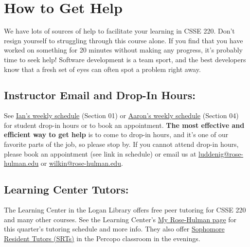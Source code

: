 \section*{How to Get Help}%
\label{sec:help}
We have lots of sources of help to facilitate your learning in CSSE 220. 
Don't resign yourself to struggling through this course alone. 
If you find that you have worked on something for 20 minutes 
without making any progress, 
it's probably time to seek help! 
Software development is a team sport, and 
the best developers know that a fresh set of eyes 
can often spot a problem right away. 

\subsection*{Instructor Email and Drop-In Hours:} 
See \href{https://docs.google.com/spreadsheets/d/1ip7XzOZyyDw10I6bsKDlkzAO0PowF4jPwrGiODMnQn8/edit?usp=sharing}{Ian's weekly schedule} (Section 01) or 
\href{https://docs.google.com/spreadsheets/d/13pt51VxLBnc-UkcqvvYSouB_YVTu_SEh5wCXk4I1-8c/edit?usp=sharing}{Aaron's weekly schedule} (Section 04)  
for student drop-in hours or to book an appointment. 
\textbf{The most effective and efficient way to get help} 
is to come to drop-in hours, and 
it's one of our favorite parts of the job, 
so please stop by. 
If you cannot attend drop-in hours, 
please book an appointment (see link in schedule) or email us at 
\href{mailto:luddenig@rose-hulman.edu}{luddenig@rose-hulman.edu} or 
\href{mailto:wilkin@rose-hulman.edu}{wilkin@rose-hulman.edu}. 


\subsection*{Learning Center Tutors:}
The Learning Center in the Logan Library offers 
free peer tutoring for CSSE 220 and many other courses. 
See the Learning Center's 
\href{https://rosehulman.sharepoint.com/sites/LC}{My Rose-Hulman page} 
for this quarter's tutoring schedule and more info. 
They also offer \href{https://rosehulman.sharepoint.com/sites/LC/SitePages/SRT-Tutoring.aspx}{Sophomore Resident Tutors (SRTs)} in the Percopo classroom in the evenings. 
